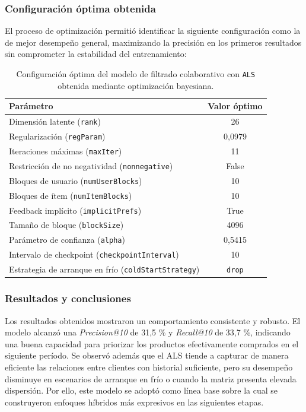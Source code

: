 \subsubsection{Configuración óptima obtenida}

El proceso de optimización permitió identificar la siguiente configuración como la de mejor desempeño general, maximizando la precisión en los primeros resultados sin comprometer la estabilidad del entrenamiento:

\begin{table}[h]
	\centering
	\caption[Hiperparámetros óptimos del modelo ALS]{Configuración óptima del modelo de filtrado colaborativo con \texttt{ALS} obtenida mediante optimización bayesiana.}
	\begin{tabular}{l c}
		\toprule
		\textbf{Parámetro} & \textbf{Valor óptimo} \\
		\midrule
		Dimensión latente (\texttt{rank}) & 26 \\
		Regularización (\texttt{regParam}) & 0{,}0979 \\
		Iteraciones máximas (\texttt{maxIter}) & 11 \\
		Restricción de no negatividad (\texttt{nonnegative}) & False \\
		Bloques de usuario (\texttt{numUserBlocks}) & 10 \\
		Bloques de ítem (\texttt{numItemBlocks}) & 10 \\
		Feedback implícito (\texttt{implicitPrefs}) & True \\
		Tamaño de bloque (\texttt{blockSize}) & 4096 \\
		Parámetro de confianza (\texttt{alpha}) & 0{,}5415 \\
		Intervalo de checkpoint (\texttt{checkpointInterval}) & 10 \\
		Estrategia de arranque en frío (\texttt{coldStartStrategy}) & \texttt{drop} \\
		\bottomrule
	\end{tabular}
	\label{tab:best_params_als}
\end{table}

\subsubsection{Resultados y conclusiones}

Los resultados obtenidos mostraron un comportamiento consistente y robusto. El modelo alcanzó una \textit{Precision@10} de 31{,}5 \% y \textit{Recall@10} de 33{,}7 \%, indicando una buena capacidad para priorizar los productos efectivamente comprados en el siguiente período. Se observó además que el ALS tiende a capturar de manera eficiente las relaciones entre clientes con historial suficiente, pero su desempeño disminuye en escenarios de arranque en frío o cuando la matriz presenta elevada dispersión. Por ello, este modelo se adoptó como línea base sobre la cual se construyeron enfoques híbridos más expresivos en las siguientes etapas.

